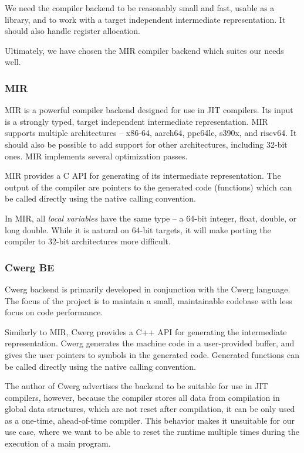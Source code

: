 We need the compiler backend to be reasonably small and fast, usable as a library, and to work with a target independent intermediate representation. It should also handle register allocation.

Ultimately, we have chosen the MIR compiler backend which suites our needs well.


\subsubsection{MIR}

MIR is a powerful compiler backend designed for use in JIT compilers\cite{mir}. Its input is a strongly typed, target independent intermediate representation. MIR supports multiple architectures -- x86-64, aarch64, ppc64le, s390x, and riscv64. It should also be possible to add support for other architectures, including 32-bit ones. MIR implements several optimization passes.

MIR provides a C API for generating of its intermediate representation. The output of the compiler are pointers to the generated code (functions) which can be called directly using the native calling convention.

In MIR, all \textit{local variables} have the same type -- a 64-bit integer, float, double, or long double. While it is natural on 64-bit targets, it will make porting the compiler to 32-bit architectures more difficult.


\subsubsection{Cwerg BE}

Cwerg backend is primarily developed in conjunction with the Cwerg language\cite{cwerg}. The focus of the project is to maintain a small, maintainable codebase with less focus on code performance.

Similarly to MIR, Cwerg provides a C++ API for generating the intermediate representation. Cwerg generates the machine code in a user-provided buffer, and gives the user pointers to symbols in the generated code. Generated functions can be called directly using the native calling convention.

The author of Cwerg advertises the backend to be suitable for use in JIT compilers, however, because the compiler stores all data from compilation in global data structures, which are not reset after compilation, it can be only used as a one-time, ahead-of-time compiler. This behavior makes it unsuitable for our use case, where we want to be able to reset the runtime multiple times during the execution of a main program.


